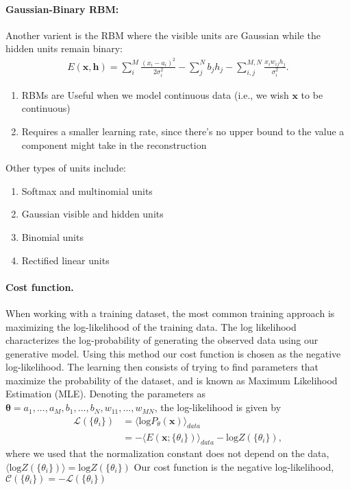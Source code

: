 \documentclass[%
oneside,                 %
final,                   %
10pt]{article}
\begin{document}
\paragraph{Gaussian-Binary RBM:}

Another varient is the RBM where the visible units are Gaussian while the hidden units remain binary:
\begin{align}
	E(\mathbf{x}, \mathbf{h}) = \sum_i^M \frac{(x_i - a_i)^2}{2\sigma_i^2} - \sum_j^N b_j h_j - \sum_{i,j}^{M,N} \frac{x_i w_{ij} h_j}{\sigma_i^2}. 
\end{align}



\begin{enumerate}
\item RBMs are Useful when we model continuous data (i.e., we wish $\mathbf{x}$ to be continuous)

\item Requires a smaller learning rate, since there's no upper bound to the value a component might take in the reconstruction
\end{enumerate}

\noindent
Other types of units include:
\begin{enumerate}
\item Softmax and multinomial units

\item Gaussian visible and hidden units

\item Binomial units

\item Rectified linear units
\end{enumerate}

\noindent
\paragraph{Cost function.}
When working with a training dataset, the most common training approach is maximizing the log-likelihood of the training data. The log likelihood characterizes the log-probability of generating the observed data using our generative model. Using this method our cost function is chosen as the negative log-likelihood. The learning then consists of trying to find parameters that maximize the probability of the dataset, and is known as Maximum Likelihood Estimation (MLE).
Denoting the parameters as $\bm{\theta} = a_1,...,a_M,b_1,...,b_N,w_{11},...,w_{MN}$, the log-likelihood is given by
\begin{align}
	\mathcal{L}(\{ \theta_i \}) &= \langle \text{log} P_\theta(\bm{x}) \rangle_{data} \\
	&= - \langle E(\bm{x}; \{ \theta_i\}) \rangle_{data} - \text{log} Z(\{ \theta_i\}),
\end{align}
where we used that the normalization constant does not depend on the data, $\langle \text{log} Z(\{ \theta_i\}) \rangle = \text{log} Z(\{ \theta_i\})$
Our cost function is the negative log-likelihood, $\mathcal{C}(\{ \theta_i \}) = - \mathcal{L}(\{ \theta_i \})$
\end{document}
